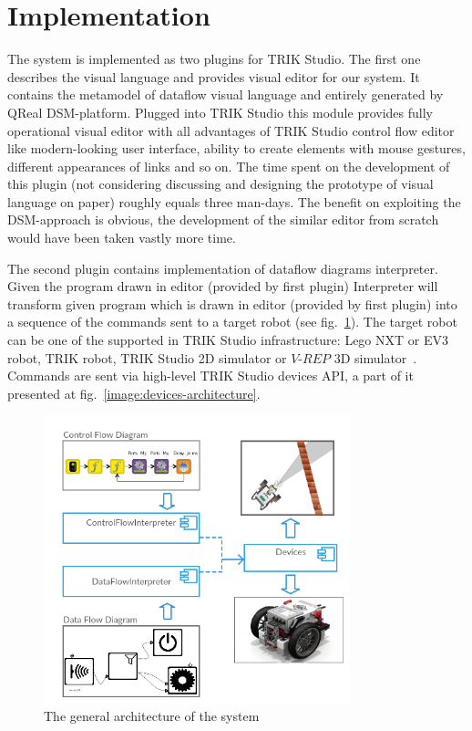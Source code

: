 \documentclass[conference,compsoc]{IEEEtran}
\begin{document}
\section{Implementation}
\label{sec:Implementation}
The system is implemented as two plugins for TRIK Studio. The first one describes the visual language and provides visual editor for our system. It contains the metamodel of dataflow visual language and entirely generated by QReal DSM-platform. Plugged into TRIK Studio this module provides fully operational visual editor with all advantages of TRIK Studio control flow editor like modern-looking user interface, ability to create elements with mouse gestures, different appearances of links and so on. The time spent on the development of this plugin (not considering discussing and designing the prototype of visual language on paper) roughly equals three man-days. The benefit on exploiting the DSM-approach is obvious, the development of the similar editor from scratch would have been taken vastly more time.

The second plugin contains implementation of dataflow diagrams interpreter. Given the program drawn in editor (provided by first plugin) Interpreter will transform given program which is drawn in editor (provided by first plugin) into a sequence of the commands sent to a target robot (see fig.~\ref{image:common-architecture}). The target robot can be one of the supported in TRIK Studio infrastructure: Lego NXT or EV3 robot, TRIK robot, TRIK Studio 2D simulator or $V\mbox{-}REP$ 3D simulator~\cite{rohmer2013v}. Commands are sent via high-level TRIK Studio devices API, a part of it presented at fig.~\ref{image:devices-architecture}.

\begin{figure}[ht]
	\centering
	\includegraphics[width=3.5in]{Common.png}
	\caption{The general architecture of the system}
	\label{image:common-architecture}
\end{figure}
\end{document}
